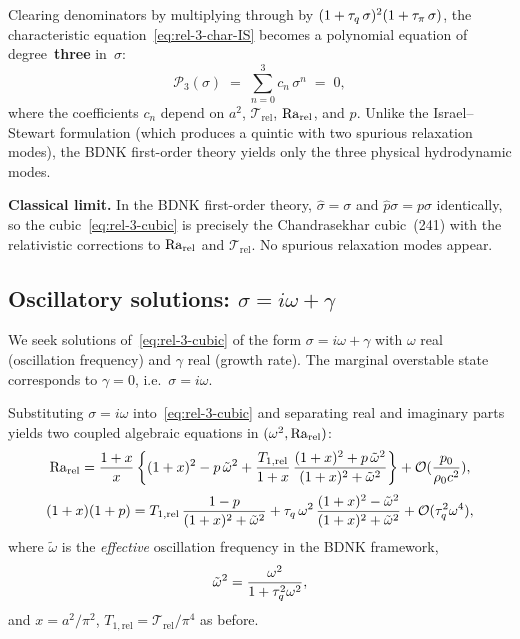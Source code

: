 Clearing denominators by multiplying through by
$(1+\tau_{q}\,\sigma)^{2}(1+\tau_{\pi}\,\sigma)$, the characteristic
equation~\eqref{eq:rel-3-char-IS} becomes a polynomial equation of
degree~\textbf{three} in~$\sigma$:
\begin{equation}\label{eq:rel-3-cubic}
  \mathcal{P}_{3}(\sigma)
  \;=\; \sum_{n=0}^{3} c_{n}\,\sigma^{n} \;=\; 0,
\end{equation}
where the coefficients $c_{n}$ depend on $a^{2}$, $\mathscr{T}_{\mathrm{rel}}$,
$\mathrm{Ra}_{\mathrm{rel}}$, and $p$.  Unlike the Israel--Stewart formulation (which
produces a quintic with two spurious relaxation modes), the BDNK
first-order theory yields only the three physical hydrodynamic modes.

\begin{relcorrection}
\textbf{Classical limit.}\quad
In the BDNK first-order theory, $\hat{\sigma} = \sigma$ and
$\hat{p}\sigma = p\sigma$ identically, so the cubic~\eqref{eq:rel-3-cubic}
is precisely the Chandrasekhar cubic~(241) with the relativistic
corrections to $\mathrm{Ra}_{\mathrm{rel}}$ and $\mathscr{T}_{\mathrm{rel}}$.  No spurious
relaxation modes appear.
\end{relcorrection}

\subsection{Oscillatory solutions: $\sigma = i\omega + \gamma$}

We seek solutions of~\eqref{eq:rel-3-cubic} of the form
$\sigma = i\omega + \gamma$ with $\omega$ real (oscillation frequency)
and $\gamma$ real (growth rate).  The marginal overstable state
corresponds to $\gamma = 0$, i.e.\ $\sigma = i\omega$.

Substituting $\sigma = i\omega$ into~\eqref{eq:rel-3-cubic} and
separating real and imaginary parts yields two coupled algebraic
equations in $(\omega^{2}, \mathrm{Ra}_{\mathrm{rel}})$:
\begin{equation}\label{eq:rel-3-omega-eq}
  \mathrm{Ra}_{\mathrm{rel}} = \frac{1+x}{x}\,
  \biggl\{
    (1+x)^{2} - p\,\tilde{\omega}^{2}
    + \frac{T_{1,\mathrm{rel}}}{1+x}\,
      \frac{(1+x)^{2}+p\,\tilde{\omega}^{2}}
           {(1+x)^{2}+\tilde{\omega}^{2}}
  \biggr\}
  + \mathcal{O}(\frac{p_{0}}{\rho_0 c^{2}}),
\end{equation}
\begin{equation}\label{eq:rel-3-freq-eq}
  (1+x)(1+p) = T_{1,\mathrm{rel}}\,
  \frac{1-p}{(1+x)^{2}+\tilde{\omega}^{2}}
  + \tau_{q}\,\omega^{2}\,\frac{(1+x)^{2}-\tilde{\omega}^{2}}
       {(1+x)^{2}+\tilde{\omega}^{2}}
  + \mathcal{O}(\tau_{q}^{2}\omega^{4}),
\end{equation}
where $\tilde{\omega}$ is the \emph{effective} oscillation frequency
in the BDNK framework,
\begin{equation}\label{eq:rel-3-omegatilde}
  \tilde{\omega}^{2}
  = \frac{\omega^{2}}{1 + \tau_{q}^{2}\omega^{2}},
\end{equation}
and $x = a^{2}/\pi^{2}$, $T_{1,\mathrm{rel}} = \mathscr{T}_{\mathrm{rel}}/\pi^{4}$
as before.


